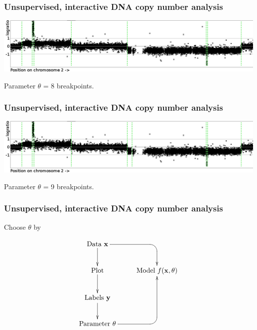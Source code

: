 \documentclass{beamer}
\begin{document}
\begin{frame}
  \frametitle{Unsupervised, interactive DNA copy number analysis}
  \includegraphics[width=\textwidth]{unlabeled-breakpoints-8}

  Parameter $\theta$ = 8 breakpoints.
\end{frame}

\begin{frame}
  \frametitle{Unsupervised, interactive DNA copy number analysis}
  \includegraphics[width=\textwidth]{unlabeled-breakpoints-9}

  Parameter $\theta$ = 9 breakpoints.
\end{frame}

\begin{frame}
  \frametitle{Unsupervised, interactive DNA copy number analysis}
  
  Choose $\theta$ by 

  \begin{displaymath}
  \xymatrix{
    \text{Data $\mathbf x$}
    \ar `[r] [dr] 
    \ar [d]
    & \text{ }
    \\
    \text{Plot} 
    \ar [d]
    & 
    \text{Model $f(\mathbf x, \theta)$} 
    \\
    \text{Labels $\mathbf y$}       
    \ar [d]
    \\
    \text{Parameter $\theta$} 
    \ar `r[ruu] [ruu]
    & \text{ }
  }
  \end{displaymath}
\end{frame}
\end{document}
